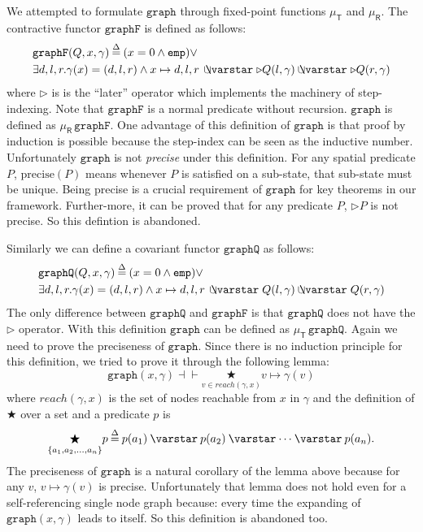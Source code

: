 We attempted to formulate $\mathtt{graph}$ through fixed-point
functions $\mu_{\mathsf{T}}$ and $\mu_{\mathsf{R}}$. The contractive
functor $\mathtt{graphF}$ is defined as follows:
\[\label{eqn:graphFcotr}
  \begin{split}
  & \mathtt{graphF}(Q, x, \gamma)\defeq (x = 0 \wedge \mathtt{emp})
    \vee \\ & \exists d,l,r . \gamma(x)=(d,l,r) \wedge x \mapsto
    d,l,r\, \ocon \triangleright Q(l, \gamma) \ocon \triangleright
    Q(r, \gamma)
  \end{split}
\]
where $\triangleright$ is is the ``later'' operator which implements
the machinery of step-indexing. Note that $\mathtt{graphF}$ is a
normal predicate without recursion. $\mathtt{graph}$ is defined as
$\mu_{\mathsf{R}}\,\mathtt{graphF}$. One advantage of this definition
of $\mathtt{graph}$ is that proof by induction is possible because the
step-index can be seen as the inductive number. Unfortunately
$\mathtt{graph}$ is not \emph{precise} under this definition. For any
spatial predicate $P$, $\text{precise}(P)$ means whenever $P$ is
satisfied on a sub-state, that sub-state must be unique. Being precise
is a crucial requirement of $\mathtt{graph}$ for key theorems in our
framework. Further-more, it can be proved that for any predicate $P$,
$\triangleright P$ is not precise. So this defintion is abandoned.

Similarly we can define a covariant functor $\mathtt{graphQ}$ as
follows:
\[\label{eqn:graphFco}
  \begin{split}
  & \mathtt{graphQ}(Q, x, \gamma)\defeq (x = 0 \wedge
  \mathtt{emp}) \vee \\ & \exists d,l,r . \gamma(x)=(d,l,r) \wedge  x
  \mapsto d,l,r\, \ocon Q(l, \gamma) \ocon Q(r, \gamma)
  \end{split}
\]
The only difference between $\mathtt{graphQ}$ and $\mathtt{graphF}$ is
that $\mathtt{graphQ}$ does not have the $\triangleright$
operator. With this definition $\mathtt{graph}$ can be defined as
$\mu_{\mathsf{T}}\,\mathtt{graphQ}$. Again we need to prove the
preciseness of $\mathtt{graph}$. Since there is no induction principle
for this definition, we tried to prove it through the following lemma:
\begin{equation}\label{eqn:graph_iter}
\mathtt{graph}(x, \gamma) \dashv\vdash
\underset{v\in\mathit{reach}(\gamma, x)}{\bigstar} v\mapsto\gamma(v)
\end{equation}
where $\mathit{reach}(\gamma, x)$ is the set of nodes reachable from
$x$ in $\gamma$ and the definition of $\bigstar$ over a set and a
predicate $p$ is
\begin{equation*}
  \underset{\{a_1, a_2,\dots,a_n\}}{\bigstar}p \defeq p(a_1) \scon
  p(a_2) \scon \dots \scon p(a_n).
\end{equation*}
The preciseness of $\mathtt{graph}$ is a natural corollary of the
lemma above because for any $v$, $v\mapsto\gamma(v)$ is
precise. Unfortunately that lemma does not hold even for a
self-referencing single node graph because: every time the expanding
of $\mathtt{graph}(x,\gamma)$ leads to itself. So this definition is
abandoned too.

